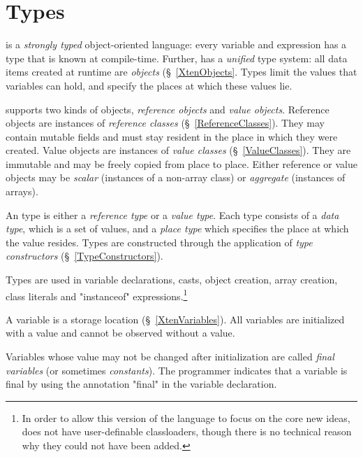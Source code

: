 \chapter{Types}
\label{XtenTypes}

{}\Xten{} is a {\em strongly typed} object-oriented language: every variable
and expression has a type that is known at compile-time. Further,
\Xten{} has a {\em unified} type system: all data items created at
runtime are {\em objects} (\S~\ref{XtenObjects}. Types limit the
values that variables can hold, and specify the places at which these
values lie.

{}\Xten{} supports two kinds of objects, {\em reference objects} and
{\em value objects}.  Reference objects are instances of {\em
reference classes} (\S~\ref{ReferenceClasses}). They may contain
mutable fields and must stay resident in the place in which they were
created. Value objects are instances of {\em value classes}
(\S~\ref{ValueClasses}). They are immutable and may be freely copied
from place to place. Either reference or value objects may be 
{\em scalar} (instances of a non-array class) or {\em aggregate} (instances
of arrays).

An \Xten{} type is either a {\em reference type} or a {\em value
type}.  Each type consists of a {\em data type}, which is a set of
values, and a {\em place type} which specifies the place at which the
value resides.  Types are constructed through the application of {\em
type constructors} (\S~\ref{TypeConstructors}).

Types are used in variable declarations, casts, object creation, array
creation, class literals and \xcd"instanceof" expressions.\footnote{In
order to allow this version of the language to focus on the core new
ideas, \XtenCurrVer{} does not have user-definable classloaders,
though there is no technical reason why they could not have been
added.}

A variable is a storage location (\S~\ref{XtenVariables}). All
variables are initialized with a value and cannot be observed without
a value. 

Variables whose value may not be changed after initialization are
called {\em final variables} (or sometimes {\em constants}).  The
programmer indicates that a variable is final by using the annotation
\xcd"final" in the variable declaration.  


